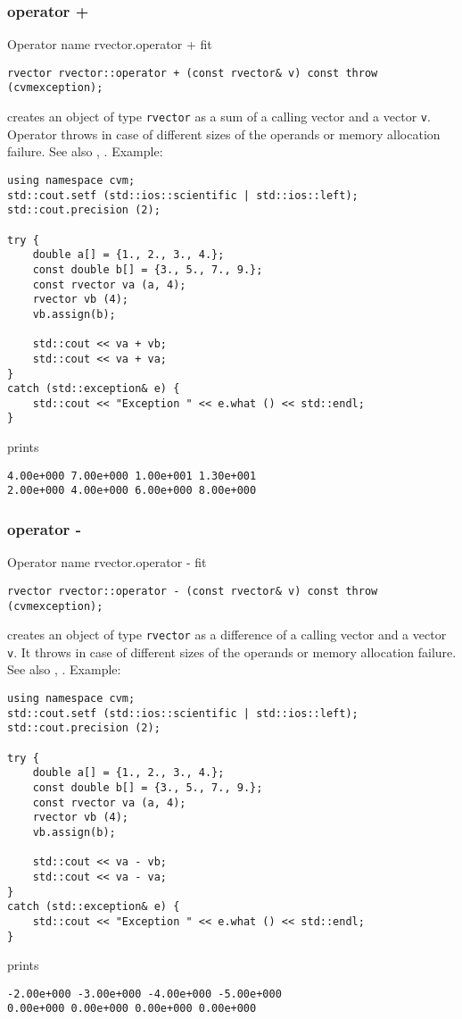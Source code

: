 \subsubsection{operator +}
Operator%
\pdfdest name {rvector.operator +} fit
\begin{verbatim}
rvector rvector::operator + (const rvector& v) const throw (cvmexception);
\end{verbatim}
creates an object of type \verb"rvector" as a sum of
a calling vector and a vector \verb"v".
Operator throws  
in case of different sizes of the operands
or memory allocation failure.
See also ,
.
Example:
\begin{Verbatim}
using namespace cvm;
std::cout.setf (std::ios::scientific | std::ios::left); 
std::cout.precision (2);

try {
    double a[] = {1., 2., 3., 4.};
    const double b[] = {3., 5., 7., 9.};
    const rvector va (a, 4);
    rvector vb (4);
    vb.assign(b);

    std::cout << va + vb;
    std::cout << va + va;
}
catch (std::exception& e) {
    std::cout << "Exception " << e.what () << std::endl;
}
\end{Verbatim}
prints
\begin{Verbatim}
4.00e+000 7.00e+000 1.00e+001 1.30e+001
2.00e+000 4.00e+000 6.00e+000 8.00e+000
\end{Verbatim}
\newpage


\subsubsection{operator -}
Operator%
\pdfdest name {rvector.operator -} fit
\begin{verbatim}
rvector rvector::operator - (const rvector& v) const throw (cvmexception);
\end{verbatim}
creates an object of type \verb"rvector" as a difference of
a calling vector and a vector \verb"v".
It throws  
in case of different sizes of the operands
or memory allocation failure.
See also , .
Example:
\begin{Verbatim}
using namespace cvm;
std::cout.setf (std::ios::scientific | std::ios::left); 
std::cout.precision (2);

try {
    double a[] = {1., 2., 3., 4.};
    const double b[] = {3., 5., 7., 9.};
    const rvector va (a, 4);
    rvector vb (4);
    vb.assign(b);

    std::cout << va - vb;
    std::cout << va - va;
}
catch (std::exception& e) {
    std::cout << "Exception " << e.what () << std::endl;
}
\end{Verbatim}
prints
\begin{Verbatim}
-2.00e+000 -3.00e+000 -4.00e+000 -5.00e+000
0.00e+000 0.00e+000 0.00e+000 0.00e+000
\end{Verbatim}
\newpage


